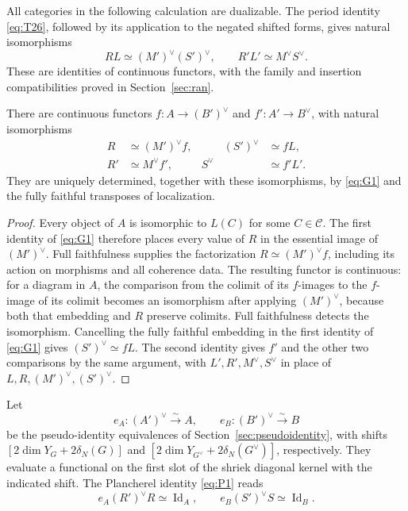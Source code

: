 All categories in the following calculation are dualizable.  The period
identity \eqref{eq:T26}, followed by its application to the negated
shifted forms, gives natural isomorphisms
\begin{equation}\label{eq:G1}
 RL\simeq(M')^\vee(S')^\vee,
 \qquad
 R'L'\simeq M^\vee S^\vee.
\end{equation}
These are identities of continuous functors, with the family and
insertion compatibilities proved in Section~\ref{sec:ran}.

\begin{lemma}\label{equivalence:factorization}
There are continuous functors
\(f:A\to(B')^\vee\) and \(f':A'\to B^\vee\), with natural
isomorphisms
\begin{equation}\label{eq:G2}
 \begin{aligned}
 R&\simeq(M')^\vee f,&\qquad (S')^\vee&\simeq fL,\\
 R'&\simeq M^\vee f',& S^\vee&\simeq f'L'.
 \end{aligned}
\end{equation}
They are uniquely determined, together with these isomorphisms, by
\eqref{eq:G1} and the fully faithful transposes of localization.
\end{lemma}

\begin{proof}
Every object of \(A\) is isomorphic to \(L(C)\) for some
\(C\in\mathcal C\).  The first identity of \eqref{eq:G1} therefore
places every value of \(R\) in the essential image of \((M')^\vee\).
Full faithfulness supplies the factorization \(R\simeq(M')^\vee f\),
including its action on morphisms and all coherence data.  The resulting
functor is continuous: for a diagram in \(A\), the comparison from the
colimit of its \(f\)-images to the \(f\)-image of its colimit becomes an
isomorphism after applying \((M')^\vee\), because both that embedding
and \(R\) preserve colimits.  Full faithfulness detects the
isomorphism.  Cancelling the fully faithful embedding in the first
identity of \eqref{eq:G1} gives \((S')^\vee\simeq fL\).
The second identity gives \(f'\) and the other two comparisons by the
same argument, with \(L',R',M^\vee,S^\vee\) in place of
\(L,R,(M')^\vee,(S')^\vee\).
\end{proof}

Let
\[
 e_A:(A')^\vee\xrightarrow{\sim}A,
 \qquad e_B:(B')^\vee\xrightarrow{\sim}B
\]
be the pseudo-identity equivalences of Section~\ref{sec:pseudoidentity},
with shifts \([2\dim Y_G+2\delta_N(G)]\) and
\([2\dim Y_{G^\vee}+2\delta_N(G^\vee)]\), respectively.  They evaluate
a functional on the first slot of the shriek diagonal kernel with the
indicated shift.  The Plancherel identity \eqref{eq:P1} reads
\begin{equation}\label{eq:G3}
 e_A(R')^\vee R\simeq\operatorname{Id}_A,
 \qquad
 e_B(S')^\vee S\simeq\operatorname{Id}_B.
\end{equation}

